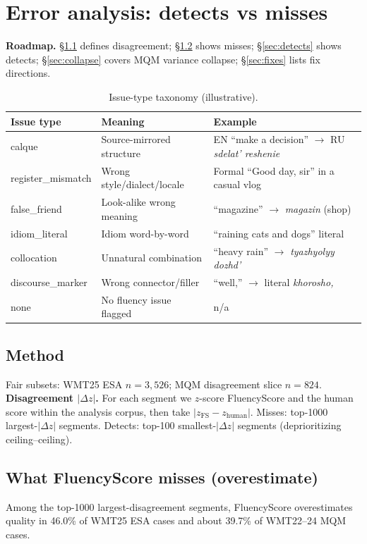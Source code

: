 \documentclass[11pt]{article}
\newcommand{\FS}{FluencyScore}
\begin{document}
\section{Error analysis: detects vs misses}
\label{sec:error}
\textbf{Roadmap.}
\S\ref{sec:ea-method} defines disagreement;
\S\ref{sec:misses} shows misses;
\S\ref{sec:detects} shows detects;
\S\ref{sec:collapse} covers MQM variance collapse;
\S\ref{sec:fixes} lists fix directions.


\begin{table}[t]
\centering
\scriptsize
\caption{Issue-type taxonomy (illustrative).}
\label{tab:8a}
\begin{tabularx}{\columnwidth}{@{}>{\raggedright\arraybackslash}X>{\raggedright\arraybackslash}X>{\raggedright\arraybackslash}X@{}}
\toprule
Issue type & Meaning & Example \\
\midrule
calque & Source-mirrored structure & EN ``make a decision'' $\to$ RU \emph{sdelat' reshenie} \\
register\_mismatch & Wrong style/dialect/locale & Formal ``Good day, sir'' in a casual vlog \\
false\_friend & Look-alike wrong meaning & ``magazine'' $\to$ \emph{magazin} (shop) \\
idiom\_literal & Idiom word-by-word & ``raining cats and dogs'' literal \\
collocation & Unnatural combination & ``heavy rain'' $\to$ \emph{tyazhyolyy dozhd'} \\
discourse\_marker & Wrong connector/filler & ``well,'' $\to$ literal \emph{khorosho,} \\
none & No fluency issue flagged & n/a \\
\bottomrule
\end{tabularx}

\end{table}


\subsection{Method}
\label{sec:ea-method}
Fair subsets: WMT25 ESA $n{=}3{,}526$; MQM disagreement slice $n{=}824$.
\textbf{Disagreement $|\Delta z|$.}
For each segment we $z$-score \FS{} and the human score within the analysis
corpus, then take $|z_{\mathrm{FS}}-z_{\mathrm{human}}|$.
Misses: top-1000 largest-$|\Delta z|$ segments.
Detects: top-100 smallest-$|\Delta z|$ segments (deprioritizing ceiling--ceiling).

\subsection{What \FS{} misses (overestimate)}
\label{sec:misses}
Among the top-1000 largest-disagreement segments, \FS{} overestimates quality in
46.0\% of WMT25 ESA cases and about 39.7\% of WMT22--24 MQM cases.
\end{document}
